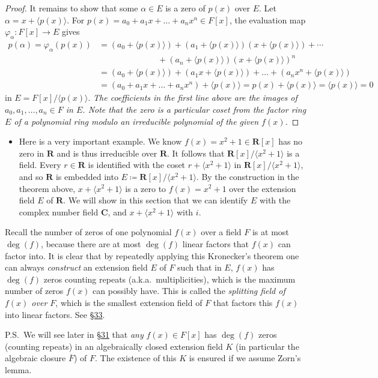\documentclass[11pt]{article}
\newcommand{\lk}[2]{\hyperlink{subsection.#1.#2}{\S#2}} %
\newcommand{\R}{\mathbf{R}}
\newcommand{\C}{\mathbf{C}}
\newcommand{\df}[1]{\textit{\textsf{#1}}}
\newcommand{\la}{\langle}
\newcommand{\ra}{\rangle}
\newcommand{\gen}[1]{\langle #1 \rangle}
\newcommand{\clos}[1]{\overline{#1}}
\renewcommand{\phi}{\varphi}
\begin{document}
\begin{itemize}
\begin{proof}
        It remains to show that some $\alpha \in E$ is a zero of $p(x)$ over $E$. Let $\alpha = x + \gen{p(x)}$. For $p(x) = a_0 + a_1x + \dots + a_n x^n \in F[x]$, the evaluation map $\phi_\alpha\colon F[x] \to E$ gives 
        \begin{align*}
            p(\alpha) = \phi_\alpha(p(x)) & = (a_0 + \gen{p(x)}) + (a_1 + \gen{p(x)})(x + \gen{p(x)}) + \cdots \\ & \qquad \qquad \qquad \quad + (a_n + \gen{p(x)})(x+\gen{p(x)})^n \\ & = (a_0 + \gen{p(x)}) + (a_1x + \gen{p(x)}) + \dots + (a_nx^n + \gen{p(x)}) \\ & = (a_0 + a_1x + \dots + a_n x^n) + \gen{p(x)} = p(x) + \gen{p(x)} = \gen{p(x)} = 0
        \end{align*}
        in $E = F[x]/\gen{p(x)}$. \emph{The coefficients in the first line above are the images of $a_0,a_1,\dots,a_n \in F$ in $E$. Note that the zero is a particular coset from the factor ring $E$ of a polynomial ring modulo an irreducible polynomial of the given $f(x)$.}
    \end{proof}
    \begin{itemize}
        \item Here is a very important example. We know $f(x) = x^2 + 1 \in \R[x]$ has no zero in $\R$ and is thus irreducible over $\R$. It follows that $\R[x]/\la x^2 + 1 \ra$ is a field. Every $r \in \R$ is identified with the coset $r + \la x^2 + 1 \ra$ in $\R[x]/\la x^2+1 \ra$, and so $\R$ is embedded into $E \coloneqq \R[x]/\la x^2+1 \ra$. By the construction in the theorem above, $x + \la x^2+1 \ra$ is a zero to $f(x) = x^2 + 1$ over the extension field $E$ of $\R$. We will show in this section that we can identify $E$ with the complex number field $\C$, and $x + \la x^2+1 \ra$ with $i$.
    \end{itemize}
\end{itemize}
    \begin{framed}
    Recall the number of zeros of one polynomial $f(x)$ over a field $F$ is at most $\deg(f)$, because there are at most $\deg(f)$ linear factors that $f(x)$ can factor into. It is clear that by repeatedly applying this Kronecker's theorem one can always \emph{construct} an extension field $E$ of $F$ such that in $E$, $f(x)$ has $\deg(f)$ zeros counting repeats (a.k.a.\ multiplicities), which is the maximum number of zeros $f(x)$ can possibly have. This is called the \df{splitting field of $f(x)$ over $F$}, which is the smallest extension field of $F$ that factors this $f(x)$ into linear factors. See \lk{6}{33}.
    
    P.S.\ We will see later in \lk{6}{31} that \emph{any} $f(x) \in F[x]$ has $\deg(f)$ zeros (counting repeats) in an algebraically closed extension field $K$ (in particular the algebraic closure $\clos{F}$) of $F$. The existence of this $K$ is ensured if we assume Zorn's lemma.
    \end{framed}
\end{document}
